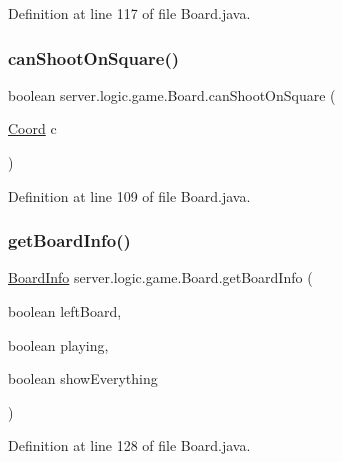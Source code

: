 Definition at line 117 of file Board.\+java.

\hypertarget{classserver_1_1logic_1_1game_1_1_board_a712480f632538d25735956557c21abad}{}\label{classserver_1_1logic_1_1game_1_1_board_a712480f632538d25735956557c21abad} 
\subsubsection{\texorpdfstring{can\+Shoot\+On\+Square()}{canShootOnSquare()}}
{\footnotesize\ttfamily boolean server.\+logic.\+game.\+Board.\+can\+Shoot\+On\+Square (\begin{DoxyParamCaption}\item[{\hyperlink{classsharedlib_1_1utils_1_1_coord}{Coord}}]{c }\end{DoxyParamCaption})}



Definition at line 109 of file Board.\+java.

\hypertarget{classserver_1_1logic_1_1game_1_1_board_a089704355e9f5ee22651d7a410b0ca1e}{}\label{classserver_1_1logic_1_1game_1_1_board_a089704355e9f5ee22651d7a410b0ca1e} 
\subsubsection{\texorpdfstring{get\+Board\+Info()}{getBoardInfo()}}
{\footnotesize\ttfamily \hyperlink{classsharedlib_1_1tuples_1_1_board_info}{Board\+Info} server.\+logic.\+game.\+Board.\+get\+Board\+Info (\begin{DoxyParamCaption}\item[{boolean}]{left\+Board,  }\item[{boolean}]{playing,  }\item[{boolean}]{show\+Everything }\end{DoxyParamCaption})}



Definition at line 128 of file Board.\+java.

\hypertarget{classserver_1_1logic_1_1game_1_1_board_a06057751106c2876a164c664e5bf3d26}{}\label{classserver_1_1logic_1_1game_1_1_board_a06057751106c2876a164c664e5bf3d26} 
